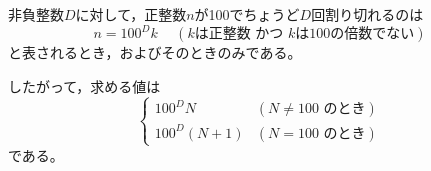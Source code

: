 \documentclass{article}
\begin{document}
非負整数$D$に対して，正整数$n$が100でちょうど$D$回割り切れるのは
\begin{equation}
    n = 100^D k \hspace{15pt} (\mbox{$k$は正整数 かつ $k$は100の倍数でない})
\end{equation}
と表されるとき，およびそのときのみである。

したがって，求める値は
\begin{equation}
    \begin{cases}
        100^D N & (\mbox{$N \neq 100$ のとき}) \\
        100^D (N + 1) & (\mbox{$N = 100$ のとき})
    \end{cases}
\end{equation}
である。
\end{document}
